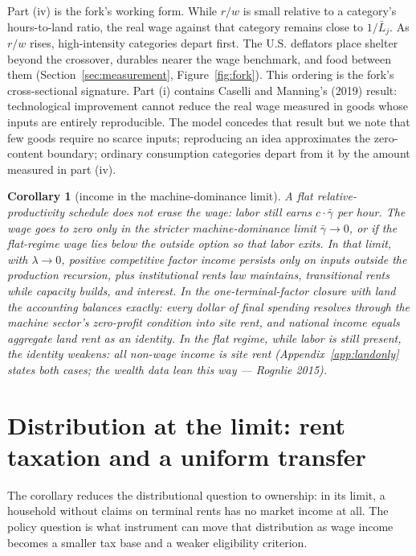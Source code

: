 \documentclass[12pt]{article}
\theoremstyle{plain}
\newtheorem*{corollary}{Corollary}
\begin{document}
Part (iv) is the fork's working form. While $r/w$ is small relative to a category's hours-to-land ratio, the real wage against that category remains close to $1/\bar{L}_j$. As $r/w$ rises, high-intensity categories depart first. The U.S. deflators place shelter beyond the crossover, durables nearer the wage benchmark, and food between them (Section~\ref{sec:measurement}, Figure~\ref{fig:fork}). This ordering is the fork's cross-sectional signature. Part (i) contains Caselli and Manning's (2019) result: technological improvement cannot reduce the real wage measured in goods whose inputs are entirely reproducible. The model concedes that result but we note that few goods require no scarce inputs; reproducing an idea approximates the zero-content boundary; ordinary consumption categories depart from it by the amount measured in part (iv).

\begin{corollary}[income in the machine-dominance limit]
A flat relative-productivity schedule does not erase the wage: labor still earns $c\cdot\bar{\gamma}$ per hour. The wage goes to zero only in the stricter machine-dominance limit $\bar{\gamma}\to0$, or if the flat-regime wage lies below the outside option so that labor exits. In that limit, with $\lambda \to 0$, positive competitive factor income persists only on inputs outside the production recursion, plus institutional rents law maintains, transitional rents while capacity builds, and interest. In the one-terminal-factor closure with land the accounting balances exactly: every dollar of final spending resolves through the machine sector's zero-profit condition into site rent, and national income equals aggregate land rent as an identity. In the flat regime, while labor is still present, the identity weakens: all non-wage income is site rent (Appendix~\ref{app:landonly} states both cases; the wealth data lean this way --- Rognlie 2015).
\end{corollary}

\section{Distribution at the limit: rent taxation and a uniform transfer}\label{sec:fiscal}

The corollary reduces the distributional question to ownership: in its limit, a household without claims on terminal rents has no market income at all. The policy question is what instrument can move that distribution as wage income becomes a smaller tax base and a weaker eligibility criterion.
\end{document}
